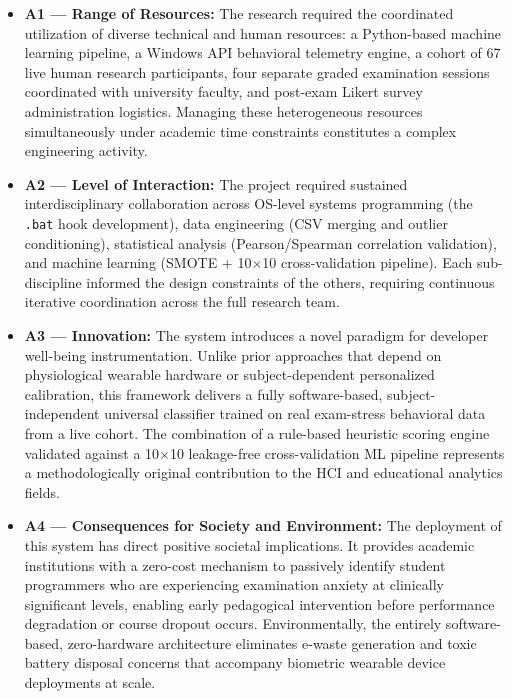 \begin{itemize}
    \item \textbf{A1 — Range of Resources:} The research required the coordinated utilization of diverse technical and human resources: a Python-based machine learning pipeline, a Windows API behavioral telemetry engine, a cohort of 67 live human research participants, four separate graded examination sessions coordinated with university faculty, and post-exam Likert survey administration logistics. Managing these heterogeneous resources simultaneously under academic time constraints constitutes a complex engineering activity.

    \item \textbf{A2 — Level of Interaction:} The project required sustained interdisciplinary collaboration across OS-level systems programming (the \texttt{.bat} hook development), data engineering (CSV merging and outlier conditioning), statistical analysis (Pearson/Spearman correlation validation), and machine learning (SMOTE + 10$\times$10 cross-validation pipeline). Each sub-discipline informed the design constraints of the others, requiring continuous iterative coordination across the full research team.

    \item \textbf{A3 — Innovation:} The system introduces a novel paradigm for developer well-being instrumentation. Unlike prior approaches that depend on physiological wearable hardware or subject-dependent personalized calibration, this framework delivers a fully software-based, subject-independent universal classifier trained on real exam-stress behavioral data from a live cohort. The combination of a rule-based heuristic scoring engine validated against a 10$\times$10 leakage-free cross-validation ML pipeline represents a methodologically original contribution to the HCI and educational analytics fields.

    \item \textbf{A4 — Consequences for Society and Environment:} The deployment of this system has direct positive societal implications. It provides academic institutions with a zero-cost mechanism to passively identify student programmers who are experiencing examination anxiety at clinically significant levels, enabling early pedagogical intervention before performance degradation or course dropout occurs. Environmentally, the entirely software-based, zero-hardware architecture eliminates e-waste generation and toxic battery disposal concerns that accompany biometric wearable device deployments at scale.
\end{itemize}

